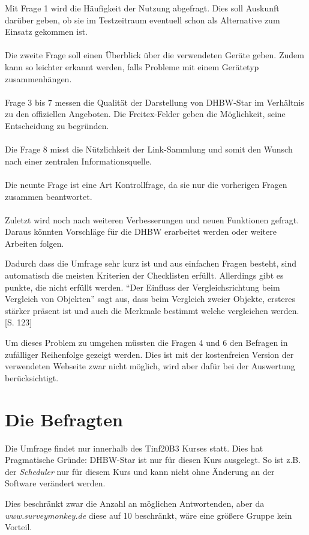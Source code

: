 Mit Frage 1 wird die Häufigkeit der Nutzung abgefragt. Dies soll Auskunft darüber geben, ob sie im Testzeitraum eventuell schon als Alternative zum Einsatz gekommen ist.
\\\\
Die zweite Frage soll einen Überblick über die verwendeten Geräte geben. Zudem kann so leichter erkannt werden, falls Probleme mit einem Gerätetyp zusammenhängen.
\\\\
Frage 3 bis 7 messen die Qualität der Darstellung von DHBW-Star im Verhältnis zu den offiziellen Angeboten. Die Freitex-Felder geben die Möglichkeit, seine Entscheidung zu begründen.
\\\\
Die Frage 8 misst die Nützlichkeit der Link-Sammlung und somit den Wunsch nach einer zentralen Informationsquelle.
\\\\
Die neunte Frage ist eine Art Kontrollfrage, da sie nur die vorherigen Fragen zusammen beantwortet.
\\\\
Zuletzt wird noch nach weiteren Verbesserungen und neuen Funktionen gefragt. Daraus könnten Vorschläge für die DHBW erarbeitet werden oder weitere Arbeiten folgen.
\\
\label{vergleichsproblem}

Dadurch dass die Umfrage sehr kurz ist und aus einfachen Fragen besteht, sind automatisch die meisten Kriterien der Checklisten erfüllt. Allerdings gibt es punkte, die nicht erfüllt werden. "`Der Einfluss der Vergleichsrichtung beim Vergleich von Objekten"' sagt aus, dass beim Vergleich zweier Objekte, ersteres stärker präsent ist und auch die Merkmale bestimmt welche vergleichen werden. \cite{fragebogenRolf} [S. 123]

Um dieses Problem zu umgehen müssten die Fragen 4 und 6 den Befragen in zufälliger Reihenfolge gezeigt werden. Dies ist mit der kostenfreien Version der verwendeten Webseite zwar nicht möglich, wird aber dafür bei der Auswertung berücksichtigt.

\section{Die Befragten}
Die Umfrage findet nur innerhalb des Tinf20B3 Kurses statt. Dies hat Pragmatische Gründe: DHBW-Star ist nur für diesen Kurs ausgelegt. So ist z.B. der \emph{Scheduler} nur für diesem Kurs und kann nicht ohne Änderung an der Software verändert werden.

Dies beschränkt zwar die Anzahl an möglichen Antwortenden, aber da \emph{www.surveymonkey.de} diese auf 10 beschränkt, wäre eine größere Gruppe kein Vorteil.